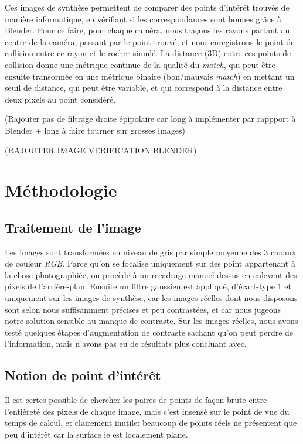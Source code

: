 \documentclass[
	a4paper, %
	10pt, %
	unnumberedsections, %
	twoside, %
]{LTJournalArticle}
\begin{document}
Ces images de synthèse permettent de comparer des points d'intérêt trouvés de manière informatique, en vérifiant si les correspondances sont bonnes grâce à Blender.
Pour ce faire, pour chaque caméra, nous traçons les rayons partant du centre de la caméra, passant par le point trouvé, et nous enregistrons le point de collision entre ce rayon et le rocher simulé.
La distance (3D) entre ces points de collision donne une métrique continue de la qualité du \textit{match}, qui peut être ensuite transormée en une métrique binaire (bon/mauvais \textit{match}) en mettant un seuil de distance, qui peut être variable, et qui correspond à la distance entre deux pixels au point considéré.

(Rajouter pas de filtrage droite épipolaire car long à implémenter par rappport à Blender + long à faire tourner sur grosses images)

(RAJOUTER IMAGE VERIFICATION BLENDER)

\section{Méthodologie}

\subsection{Traitement de l'image}
Les images sont transformées en niveau de gris par simple moyenne des $3$ canaux de couleur \textit{RGB}.
Parce qu'on se focalise uniquement sur des point appartenant à la chose photographiée, on procède
à un recadrage manuel dessus en enlevant des pixels de l'arrière-plan. Ensuite un filtre gaussien est
appliqué, d'écart-type $1$ et uniquement sur les images de synthèse, car les images réelles
dont nous disposons sont selon nous suffisamment précises et peu contrastées,
et car nous jugeons notre solution sensible au manque de contraste.
Sur les images réelles, nous avons testé quelques étapes d'augmentation
de contraste sachant qu'on peut perdre de l'information, mais n'avons pas eu
de résultats plus concluant avec.

\subsection{Notion de point d'intérêt}

Il est certes possible de chercher les paires de points de façon brute entre
l'entièreté des pixels de chaque image, mais c'est insensé sur le
point de vue du temps de calcul, et clairement inutile: beaucoup de
points réels ne présentent que peu d'intérêt car la surface ie est
localement plane.
\end{document}
